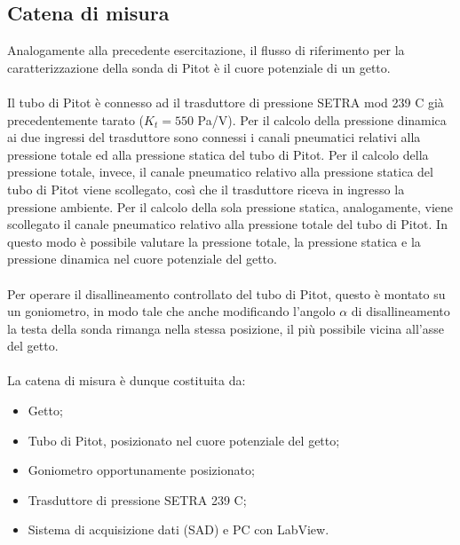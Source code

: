 \subsection{Catena di misura}
Analogamente alla precedente esercitazione, il flusso di riferimento per la caratterizzazione della sonda di Pitot è il cuore potenziale di un getto.\\\\
Il tubo di Pitot è connesso ad il trasduttore di pressione SETRA mod 239 C già precedentemente tarato ($K_t=550$ Pa/V). Per il calcolo della pressione dinamica ai due ingressi del trasduttore sono connessi i canali pneumatici relativi alla pressione totale ed alla pressione statica del tubo di Pitot. Per il calcolo della pressione totale, invece, il canale pneumatico relativo alla pressione statica del tubo di Pitot viene scollegato, così che il trasduttore riceva in ingresso la pressione ambiente. Per il calcolo della sola pressione statica, analogamente, viene scollegato il canale pneumatico relativo alla pressione totale del tubo di Pitot. In questo modo è possibile valutare la pressione totale, la pressione statica e la pressione dinamica nel cuore potenziale del getto.\\\\
Per operare il disallineamento controllato del tubo di Pitot, questo è montato su un goniometro, in modo tale che anche modificando l'angolo $\alpha$ di disallineamento la testa della sonda rimanga nella stessa posizione, il più possibile vicina all'asse del getto.\\\\
La catena di misura è dunque costituita da:
\begin{itemize}
    \item Getto;
    \item Tubo di Pitot, posizionato nel cuore potenziale del getto;
    \item Goniometro opportunamente posizionato;
    \item Trasduttore di pressione SETRA 239 C;
    \item Sistema di acquisizione dati (SAD) e PC con LabView.
\end{itemize}

